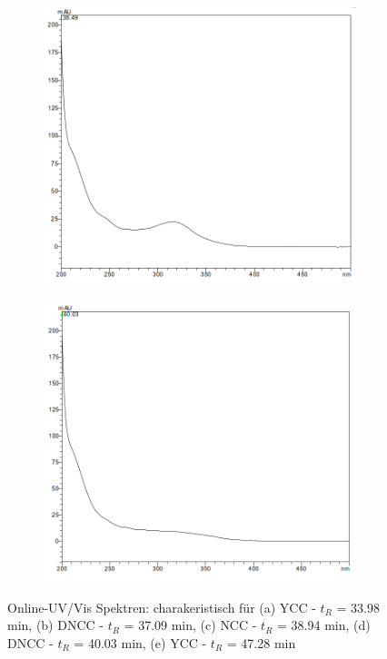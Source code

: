 \begin{figure}[!htbp]
  \begin{subfigure}[b]{0.5\textwidth}
    \includegraphics[width=\textwidth]{figures/Kapitel6/Reaktion3h/NCC3849.png}
    \caption{}
    \label{fig:NCC3849}
  \end{subfigure}
  \hfill
  \begin{subfigure}[b]{0.5\textwidth}
    \includegraphics[width=\textwidth]{figures/Kapitel6/Reaktion3h/DNCC4003.png}
    \caption{}
    \label{fig:DNCC4003}
  \end{subfigure}
  \caption[Online-UV/Vis Spektren mit der Charakteristik eines YCC bei 33.98 min, eines DNCC bei 37.09 min eines NCC bei 38.94 min sowie eines DNCC bei 40.03 min, Quelle: Autor]{Online-UV/Vis Spektren: charakeristisch für (a) \gls{YCC} - $t_R$ = 33.98 min, (b) \gls{DNCC} - $t_R$ = 37.09 min, (c) \gls{NCC} - $t_R$ = 38.94 min, (d) \gls{DNCC} - $t_R$ = 40.03 min, (e) \gls{YCC} - $t_R$ = 47.28 min}
\end{figure}

